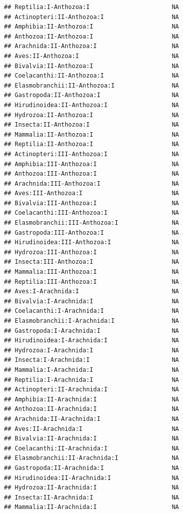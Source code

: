 \documentclass[
  12pt,
]{article}
\begin{document}
\begin{verbatim}
## Reptilia:I-Anthozoa:I                       NA
## Actinopteri:II-Anthozoa:I                   NA
## Amphibia:II-Anthozoa:I                      NA
## Anthozoa:II-Anthozoa:I                      NA
## Arachnida:II-Anthozoa:I                     NA
## Aves:II-Anthozoa:I                          NA
## Bivalvia:II-Anthozoa:I                      NA
## Coelacanthi:II-Anthozoa:I                   NA
## Elasmobranchii:II-Anthozoa:I                NA
## Gastropoda:II-Anthozoa:I                    NA
## Hirudinoidea:II-Anthozoa:I                  NA
## Hydrozoa:II-Anthozoa:I                      NA
## Insecta:II-Anthozoa:I                       NA
## Mammalia:II-Anthozoa:I                      NA
## Reptilia:II-Anthozoa:I                      NA
## Actinopteri:III-Anthozoa:I                  NA
## Amphibia:III-Anthozoa:I                     NA
## Anthozoa:III-Anthozoa:I                     NA
## Arachnida:III-Anthozoa:I                    NA
## Aves:III-Anthozoa:I                         NA
## Bivalvia:III-Anthozoa:I                     NA
## Coelacanthi:III-Anthozoa:I                  NA
## Elasmobranchii:III-Anthozoa:I               NA
## Gastropoda:III-Anthozoa:I                   NA
## Hirudinoidea:III-Anthozoa:I                 NA
## Hydrozoa:III-Anthozoa:I                     NA
## Insecta:III-Anthozoa:I                      NA
## Mammalia:III-Anthozoa:I                     NA
## Reptilia:III-Anthozoa:I                     NA
## Aves:I-Arachnida:I                          NA
## Bivalvia:I-Arachnida:I                      NA
## Coelacanthi:I-Arachnida:I                   NA
## Elasmobranchii:I-Arachnida:I                NA
## Gastropoda:I-Arachnida:I                    NA
## Hirudinoidea:I-Arachnida:I                  NA
## Hydrozoa:I-Arachnida:I                      NA
## Insecta:I-Arachnida:I                       NA
## Mammalia:I-Arachnida:I                      NA
## Reptilia:I-Arachnida:I                      NA
## Actinopteri:II-Arachnida:I                  NA
## Amphibia:II-Arachnida:I                     NA
## Anthozoa:II-Arachnida:I                     NA
## Arachnida:II-Arachnida:I                    NA
## Aves:II-Arachnida:I                         NA
## Bivalvia:II-Arachnida:I                     NA
## Coelacanthi:II-Arachnida:I                  NA
## Elasmobranchii:II-Arachnida:I               NA
## Gastropoda:II-Arachnida:I                   NA
## Hirudinoidea:II-Arachnida:I                 NA
## Hydrozoa:II-Arachnida:I                     NA
## Insecta:II-Arachnida:I                      NA
## Mammalia:II-Arachnida:I                     NA

\end{verbatim}
\end{document}
